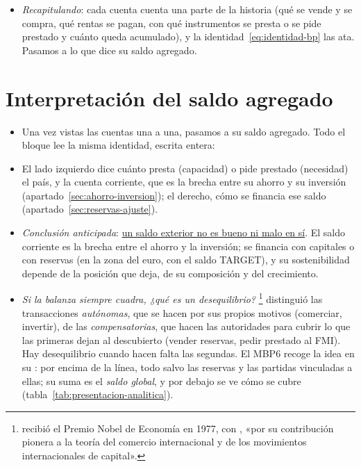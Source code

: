 \documentclass[11pt]{article}
\begin{document}
\begin{itemize}
\item \emph{Recapitulando}: cada cuenta cuenta una parte de la historia (qué se vende y se compra, qué rentas se pagan, con qué instrumentos se presta o se pide prestado y cuánto queda acumulado), y la identidad~\eqref{eq:identidad-bp} las ata. Pasamos a lo que dice su saldo agregado.
\end{itemize}


\section{Interpretación del saldo agregado}\label{sec:saldo-agregado}

\begin{itemize}
\item Una vez vistas las cuentas una a una, pasamos a su saldo agregado. Todo el bloque lee la misma identidad, escrita entera:
\item El lado izquierdo dice cuánto presta (capacidad) o pide prestado (necesidad) el país, y la cuenta corriente, que es la brecha entre su ahorro y su inversión (apartado~\ref{sec:ahorro-inversion}); el derecho, cómo se financia ese saldo (apartado~\ref{sec:reservas-ajuste}).
\item \emph{Conclusión anticipada}: \uline{un saldo exterior no es bueno ni malo en sí}. El saldo corriente es la brecha entre el ahorro y la inversión; se financia con capitales o con reservas (en la zona del euro, con el saldo TARGET), y su sostenibilidad depende de la posición que deja, de su composición y del crecimiento.
\item \emph{Si la balanza siempre cuadra, ¿qué es un desequilibrio?}  \parencite*{Meade1951}\footnote{ recibió el Premio Nobel de Economía en 1977, con , «por su contribución pionera a la teoría del comercio internacional y de los movimientos internacionales de capital»\nocite{Nobel1977MeadeOhlin}.} distinguió las transacciones \emph{autónomas}, que se hacen por sus propios motivos (comerciar, invertir), de las \emph{compensatorias}, que hacen las autoridades para cubrir lo que las primeras dejan al descubierto (vender reservas, pedir prestado al FMI). Hay desequilibrio cuando hacen falta las segundas. El MBP6 recoge la idea en su : por encima de la línea, todo salvo las reservas y las partidas vinculadas a ellas; su suma es el \emph{saldo global}, y por debajo se ve cómo se cubre (tabla~\ref{tab:presentacion-analitica})\nocite{FMI2009MBP6}.

\end{itemize}
\end{document}
